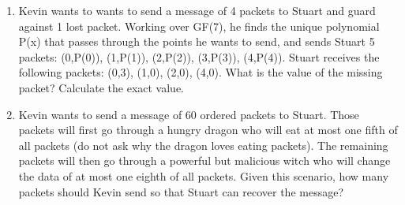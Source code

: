 \begin{enumerate}
\item Kevin wants to wants to send a message of 4 packets to Stuart and guard against 1 lost packet. Working over GF(7), he finds the unique polynomial P(x) that passes through the points he wants to send, and sends Stuart 5 packets: (0,P(0)), (1,P(1)), (2,P(2)), (3,P(3)), (4,P(4)). Stuart receives the following packets: (0,3), (1,0), (2,0), (4,0). What is the value of the missing packet? Calculate the exact value.

\item Kevin wants to send a message of 60 ordered packets to Stuart. Those packets will first go
through a hungry dragon who will eat at most one fifth of all packets (do not ask why the dragon loves eating packets). The remaining packets will then go through a powerful but malicious witch who will change the data of at most one eighth of all packets. Given this scenario, how many packets should Kevin send so that Stuart can recover the message?

\end{enumerate}